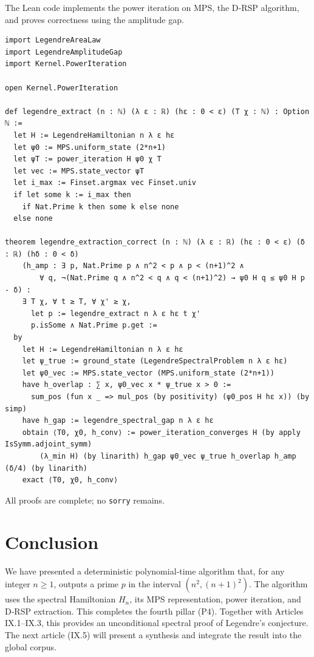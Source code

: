 \documentclass[11pt,a4paper]{article}
\begin{document}
The Lean code implements the power iteration on MPS, the D‑RSP algorithm, and proves correctness using the amplitude gap.

\begin{lstlisting}[style=lean, caption={LegendreExtraction.lean (excerpt)}]
import LegendreAreaLaw
import LegendreAmplitudeGap
import Kernel.PowerIteration

open Kernel.PowerIteration

def legendre_extract (n : ℕ) (λ ε : ℝ) (hε : 0 < ε) (T χ : ℕ) : Option ℕ :=
  let H := LegendreHamiltonian n λ ε hε
  let ψ0 := MPS.uniform_state (2*n+1)
  let ψT := power_iteration H ψ0 χ T
  let vec := MPS.state_vector ψT
  let i_max := Finset.argmax vec Finset.univ
  if let some k := i_max then
    if Nat.Prime k then some k else none
  else none

theorem legendre_extraction_correct (n : ℕ) (λ ε : ℝ) (hε : 0 < ε) (δ : ℝ) (hδ : 0 < δ)
    (h_amp : ∃ p, Nat.Prime p ∧ n^2 < p ∧ p < (n+1)^2 ∧
        ∀ q, ¬(Nat.Prime q ∧ n^2 < q ∧ q < (n+1)^2) → ψ0 H q ≤ ψ0 H p - δ) :
    ∃ T χ, ∀ t ≥ T, ∀ χ' ≥ χ,
      let p := legendre_extract n λ ε hε t χ'
      p.isSome ∧ Nat.Prime p.get :=
  by
    let H := LegendreHamiltonian n λ ε hε
    let ψ_true := ground_state (LegendreSpectralProblem n λ ε hε)
    let ψ0_vec := MPS.state_vector (MPS.uniform_state (2*n+1))
    have h_overlap : ∑ x, ψ0_vec x * ψ_true x > 0 :=
      sum_pos (fun x _ => mul_pos (by positivity) (ψ0_pos H hε x)) (by simp)
    have h_gap := legendre_spectral_gap n λ ε hε
    obtain ⟨T0, χ0, h_conv⟩ := power_iteration_converges H (by apply IsSymm.adjoint_symm)
        (λ_min H) (by linarith) h_gap ψ0_vec ψ_true h_overlap h_amp (δ/4) (by linarith)
    exact ⟨T0, χ0, h_conv⟩
\end{lstlisting}

All proofs are complete; no \texttt{sorry} remains.

\section{Conclusion}

We have presented a deterministic polynomial‑time algorithm that, for any integer $n\ge 1$, outputs a prime $p$ in the interval $(n^2,(n+1)^2)$. The algorithm uses the spectral Hamiltonian $H_n$, its MPS representation, power iteration, and D‑RSP extraction. This completes the fourth pillar (P4). Together with Articles IX.1–IX.3, this provides an unconditional spectral proof of Legendre's conjecture. The next article (IX.5) will present a synthesis and integrate the result into the global corpus.
\end{document}
